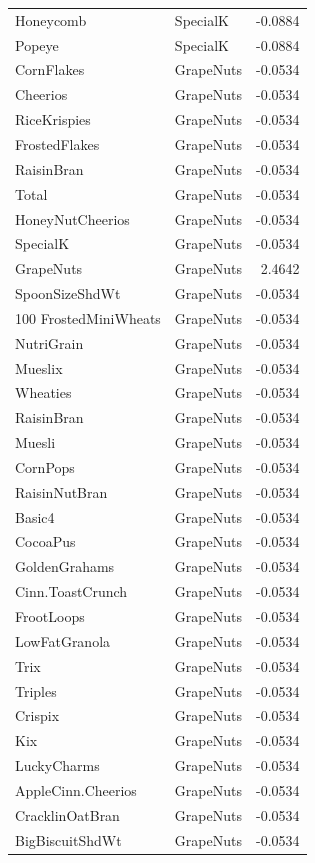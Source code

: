\begin{longtable}{llr}
Honeycomb & SpecialK & -0.0884 \\
Popeye & SpecialK & -0.0884 \\
CornFlakes & GrapeNuts & -0.0534 \\
Cheerios & GrapeNuts & -0.0534 \\
RiceKrispies & GrapeNuts & -0.0534 \\
FrostedFlakes & GrapeNuts & -0.0534 \\
RaisinBran & GrapeNuts & -0.0534 \\
Total & GrapeNuts & -0.0534 \\
HoneyNutCheerios & GrapeNuts & -0.0534 \\
SpecialK & GrapeNuts & -0.0534 \\
GrapeNuts & GrapeNuts & 2.4642 \\
SpoonSizeShdWt & GrapeNuts & -0.0534 \\
100%
FrostedMiniWheats & GrapeNuts & -0.0534 \\
NutriGrain & GrapeNuts & -0.0534 \\
Mueslix & GrapeNuts & -0.0534 \\
Wheaties & GrapeNuts & -0.0534 \\
RaisinBran & GrapeNuts & -0.0534 \\
Muesli & GrapeNuts & -0.0534 \\
CornPops & GrapeNuts & -0.0534 \\
RaisinNutBran & GrapeNuts & -0.0534 \\
Basic4 & GrapeNuts & -0.0534 \\
CocoaPus & GrapeNuts & -0.0534 \\
GoldenGrahams & GrapeNuts & -0.0534 \\
Cinn.ToastCrunch & GrapeNuts & -0.0534 \\
FrootLoops & GrapeNuts & -0.0534 \\
LowFatGranola & GrapeNuts & -0.0534 \\
Trix & GrapeNuts & -0.0534 \\
Triples & GrapeNuts & -0.0534 \\
Crispix & GrapeNuts & -0.0534 \\
Kix & GrapeNuts & -0.0534 \\
LuckyCharms & GrapeNuts & -0.0534 \\
AppleCinn.Cheerios & GrapeNuts & -0.0534 \\
CracklinOatBran & GrapeNuts & -0.0534 \\
BigBiscuitShdWt & GrapeNuts & -0.0534 \\

\end{longtable}
